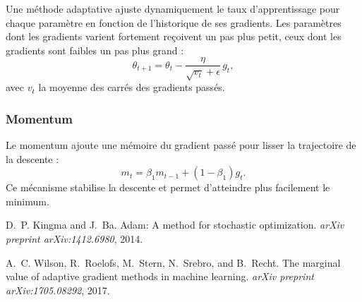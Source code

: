 \documentclass[a4paper,12pt]{article}
\begin{document}
Une méthode adaptative ajuste dynamiquement le taux d’apprentissage
pour chaque paramètre en fonction de l’historique de ses gradients.
Les paramètres dont les gradients varient fortement reçoivent un pas plus
petit, ceux dont les gradients sont faibles un pas plus grand :
\[
\theta_{t+1} = \theta_t - \frac{\eta}{\sqrt{v_t} + \epsilon} \, g_t,
\]
avec $v_t$ la moyenne des carrés des gradients passés.

\subsubsection{Momentum}
Le momentum ajoute une mémoire du gradient passé pour lisser la
trajectoire de la descente :
\[
m_t = \beta_1 m_{t-1} + (1 - \beta_1) g_t.
\]
Ce mécanisme stabilise la descente et permet d’atteindre plus facilement le minimum.


\begin{thebibliography}{9}
D.~P. Kingma and J.~Ba.
\newblock Adam: A method for stochastic optimization.
\newblock \emph{arXiv preprint arXiv:1412.6980}, 2014.

A.~C. Wilson, R.~Roelofs, M.~Stern, N.~Srebro, and B.~Recht.
\newblock The marginal value of adaptive gradient methods in machine learning.
\newblock \emph{arXiv preprint arXiv:1705.08292}, 2017.
\end{thebibliography}
\end{document}
